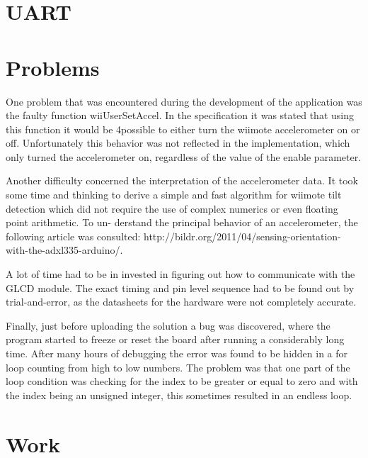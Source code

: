 \documentclass[12pt,a4paper,titlepage,oneside]{article}
\begin{document}
\section{UART}

\section{Problems}

One problem that was encountered during the development of the application was the faulty
function wiiUserSetAccel. In the specification it was stated that using this function it would be
4possible to either turn the wiimote accelerometer on or off. Unfortunately this behavior was
not reflected in the implementation, which only turned the accelerometer on, regardless of the
value of the enable parameter.

Another difficulty concerned the interpretation of the accelerometer data. It took some
time and thinking to derive a simple and fast algorithm for wiimote tilt detection which
did not require the use of complex numerics or even floating point arithmetic. To un-
derstand the principal behavior of an accelerometer, the following article was consulted:
http://bildr.org/2011/04/sensing-orientation-with-the-adxl335-arduino/.

A lot of time had to be in invested in figuring out how to communicate with the GLCD
module. The exact timing and pin level sequence had to be found out by trial-and-error, as the
datasheets for the hardware were not completely accurate.

Finally, just before uploading the solution a bug was discovered, where the program started to
freeze or reset the board after running a considerably long time. After many hours of debugging
the error was found to be hidden in a for loop counting from high to low numbers. The problem
was that one part of the loop condition was checking for the index to be greater or equal to
zero and with the index being an unsigned integer, this sometimes resulted in an endless loop.

\section{Work}
\end{document}
